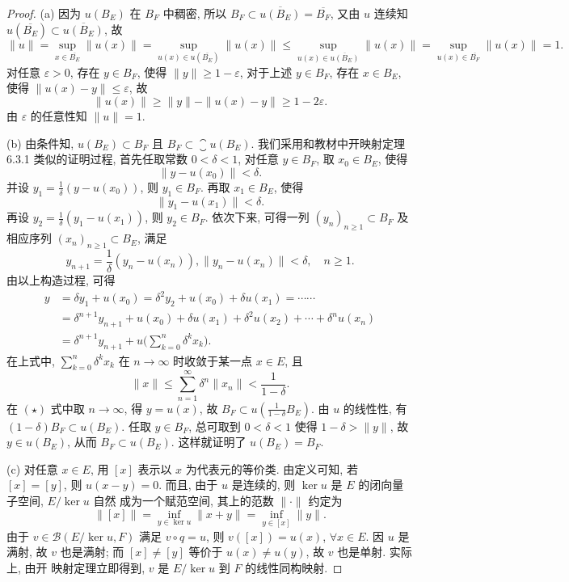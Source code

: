 \begin{proof}
    (a) 因为 $u(B_E)$ 在 $B_F$ 中稠密,
    所以 $B_F\subset\overline{u(B_E)}=\overline{B_F}$,
    又由 $u$ 连续知 $u(\overline{B_E})\subset\overline{u(B_E)}$, 故
    \[\|u\|=\sup_{x\in\overline{B_E}}\|u(x)\|=\sup_{u(x)\in u(\overline{B_E})}\|u(x)\|\leq\sup_{u(x)\in \overline{u(B_E)}}\|u(x)\|=\sup_{u(x)\in\overline{B_F}}\|u(x)\|=1.\]
    对任意 $\varepsilon>0$, 存在 $y\in B_F$,
    使得 $\|y\|\geq 1-\varepsilon$, 对于上述 $y\in B_F$, 存在 $x\in B_E$,
    使得 $\|u(x)-y\|\leq\varepsilon$, 故
    \[\|u(x)\|\geq\|y\|-\|u(x)-y\|\geq 1-2\varepsilon.\]
    由 $\varepsilon$ 的任意性知 $\|u\|=1$.

    (b) 由条件知, $u(B_{E})\subset B_{F}$ 且 $B_{F}\subset\closure{u\left(B_{E}\right)}$. 
    我们采用和教材中开映射定理 6.3.1 类似的证明过程, 首先任取常数 $0<\delta<1$, 对任意 $y\in B_{F}$, 取 $x_0\in B_{E}$, 使得
    \[
    \|y-u(x_0)\|<\delta.
    \] 
    并设 $y_{1}=\frac{1}{\delta}(y-u(x_{0}))$, 则 $y_1\in B_F$. 再取 $x_1\in B_E$, 使得
    \[
    \|y_{1}-u(x_{1})\|<\delta .
    \]
    再设 $y_2=\frac{1}{\delta}(y_1-u(x_1))$, 则 $y_2\in B_F$. 依次下来, 
    可得一列 $(y_n)_{n\geq 1}\subset B_F$ 及相应序列 $(x_n)_{n\geq 1}\subset B_E$, 满足
    \[
    y_{n+1}=\frac{1}{\delta}(y_n-u(x_n)),\|y_{n}-u(x_{n})\|<\delta, \quad n\geq 1.
    \]
    由以上构造过程, 可得
    \begin{equation}
        \begin{aligned}
            y &=\delta y_{1}+u(x_{0})=\delta^{2} y_{2}+u(x_{0})+\delta u(x_{1})=\cdots \cdots \\
            &=\delta^{n+1} y_{n+1}+u(x_{0})+\delta u(x_{1})+\delta^{2} u(x_{2})+\cdots+\delta^{n} u(x_{n}) \\
            &=\delta^{n+1} y_{n+1}+u\biggl(\sum_{k=0}^{n} \delta^{k} x_{k}\biggr).
        \end{aligned}\tag{$\star$}
    \end{equation}
    在上式中, $\sum_{k=0}^n \delta^k x_k$ 在 $n\to\infty$ 时收敛于某一点 $x\in E$, 且
    \[\|x\|\leq\sum_{n=1}^{\infty}\delta^n\|x_n\|<\frac{1}{1-\delta}.\]
    在 $(\star)$ 式中取 $n\to\infty$, 得 $y=u(x)$, 故 $B_F\subset u(\frac{1}{1-\delta}B_E)$.
    由 $u$ 的线性性, 有 $(1-\delta)B_F\subset u(B_E)$.
    任取 $y\in B_F$, 总可取到 $0<\delta<1$ 使得 $1-\delta>\|y\|$, 故
    $y\in u(B_E)$, 从而 $B_F\subset u(B_E)$. 这样就证明了 $u(B_E)=B_F$.

    (c) 对任意 $x\in E$, 用 $[x]$ 表示以 $x$ 为代表元的等价类. 由定义可知, 若 $[x]=[y]$, 则
    $u(x-y)=0$. 而且, 由于 $u$ 是连续的, 则 $\ker u$ 是 $E$ 的闭向量子空间, $E/\ker u$ 自然
    成为一个赋范空间, 其上的范数 $\|\cdot\|$ 约定为
    \[\|[x]\|=\inf_{y\in\ker u}\|x+y\|=\inf_{y\in[x]}\|y\|.\]
    由于 $v\in\mathcal{B}(E/\ker u, F)$ 满足 $v\circ q=u$, 则 $v([x])=u(x)$, $\forall x\in E$. 
    因 $u$ 是满射, 故 $v$ 也是满射; 而 $[x]\neq[y]$ 等价于 $u(x)\neq u(y)$, 故 $v$ 也是单射. 实际上, 由开
    映射定理立即得到, $v$ 是 $E/\ker u$ 到 $F$ 的线性同构映射.


\end{proof}

